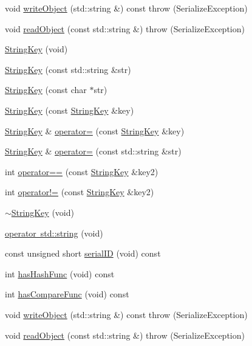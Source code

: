 \begin{DoxyCompactItemize}
\item 
void \mbox{\hyperlink{classFILEDB_1_1StringKey_a29db7eea425c851c5e0a4336d7a85fb1}{write\+Object}} (std\+::string \&) const  throw (\+Serialize\+Exception)
\item 
void \mbox{\hyperlink{classFILEDB_1_1StringKey_a25cefb184c88bc5bf871245e82ea21f9}{read\+Object}} (const std\+::string \&)  throw (\+Serialize\+Exception)
\item 
\mbox{\hyperlink{classFILEDB_1_1StringKey_ada360436c743f4464e82b0cb2757d229}{String\+Key}} (void)
\item 
\mbox{\hyperlink{classFILEDB_1_1StringKey_a18edda7351ebadd52d18bcde2cc8a71c}{String\+Key}} (const std\+::string \&str)
\item 
\mbox{\hyperlink{classFILEDB_1_1StringKey_a7710b1f6cafd04e1e178d24019e81ae5}{String\+Key}} (const char $\ast$str)
\item 
\mbox{\hyperlink{classFILEDB_1_1StringKey_a042b0231e08bfbd9f9bc3802d95d0e9c}{String\+Key}} (const \mbox{\hyperlink{classFILEDB_1_1StringKey}{String\+Key}} \&key)
\item 
\mbox{\hyperlink{classFILEDB_1_1StringKey}{String\+Key}} \& \mbox{\hyperlink{classFILEDB_1_1StringKey_ab4a0ca971c84abd8b85f6d423163a00f}{operator=}} (const \mbox{\hyperlink{classFILEDB_1_1StringKey}{String\+Key}} \&key)
\item 
\mbox{\hyperlink{classFILEDB_1_1StringKey}{String\+Key}} \& \mbox{\hyperlink{classFILEDB_1_1StringKey_ad52c218455b3eb934a68f3d13ab6512e}{operator=}} (const std\+::string \&str)
\item 
int \mbox{\hyperlink{classFILEDB_1_1StringKey_a75f2abcdf7d61bb860156f8758a56a1f}{operator==}} (const \mbox{\hyperlink{classFILEDB_1_1StringKey}{String\+Key}} \&key2)
\item 
int \mbox{\hyperlink{classFILEDB_1_1StringKey_ad7c210e36fa7438742afa4ed3c66a3df}{operator!=}} (const \mbox{\hyperlink{classFILEDB_1_1StringKey}{String\+Key}} \&key2)
\item 
\mbox{\hyperlink{classFILEDB_1_1StringKey_a45b2488c42cb895e30b927366ae96785}{$\sim$\+String\+Key}} (void)
\item 
\mbox{\hyperlink{classFILEDB_1_1StringKey_a4ce28a2e70cc35cbf7dd8f7a9424fbb0}{operator std\+::string}} (void)
\item 
const unsigned short \mbox{\hyperlink{classFILEDB_1_1StringKey_ad139b5cab667be479edae524f436805a}{serial\+ID}} (void) const
\item 
int \mbox{\hyperlink{classFILEDB_1_1StringKey_afb2fa99d53c0f4b5aeca0377228ea722}{has\+Hash\+Func}} (void) const
\item 
int \mbox{\hyperlink{classFILEDB_1_1StringKey_a430c4d6d22db7160c501c1703f9f13cf}{has\+Compare\+Func}} (void) const
\item 
void \mbox{\hyperlink{classFILEDB_1_1StringKey_a29db7eea425c851c5e0a4336d7a85fb1}{write\+Object}} (std\+::string \&) const  throw (\+Serialize\+Exception)
\item 
void \mbox{\hyperlink{classFILEDB_1_1StringKey_a25cefb184c88bc5bf871245e82ea21f9}{read\+Object}} (const std\+::string \&)  throw (\+Serialize\+Exception)
\end{DoxyCompactItemize}
